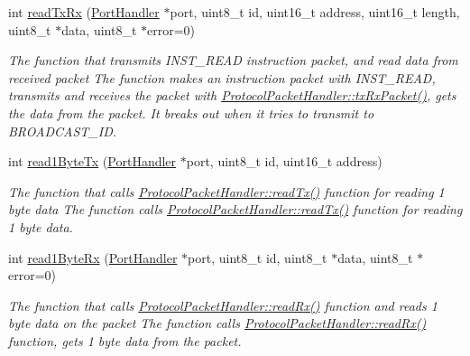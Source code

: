 \begin{DoxyCompactItemize}
int \hyperlink{classmercury_1_1_protocol_packet_handler_a368325ca9c0c783b1e88ef32a4544e51}{read\+Tx\+Rx} (\hyperlink{classmercury_1_1_port_handler}{Port\+Handler} $\ast$port, uint8\+\_\+t id, uint16\+\_\+t address, uint16\+\_\+t length, uint8\+\_\+t $\ast$data, uint8\+\_\+t $\ast$error=0)
\begin{DoxyCompactList}\small\item\em The function that transmits I\+N\+S\+T\+\_\+\+R\+E\+AD instruction packet, and read data from received packet  The function makes an instruction packet with I\+N\+S\+T\+\_\+\+R\+E\+AD,  transmits and receives the packet with \hyperlink{classmercury_1_1_protocol_packet_handler_a68b02f23af616886d0795ea12debd613}{Protocol\+Packet\+Handler\+::tx\+Rx\+Packet()},  gets the data from the packet.  It breaks out  when it tries to transmit to B\+R\+O\+A\+D\+C\+A\+S\+T\+\_\+\+ID. \end{DoxyCompactList}\item 
int \hyperlink{classmercury_1_1_protocol_packet_handler_a764ccc29353523b4a9d65fb4f49e8a34}{read1\+Byte\+Tx} (\hyperlink{classmercury_1_1_port_handler}{Port\+Handler} $\ast$port, uint8\+\_\+t id, uint16\+\_\+t address)
\begin{DoxyCompactList}\small\item\em The function that calls \hyperlink{classmercury_1_1_protocol_packet_handler_aebb2c28d6b3f2e87c7a56b757a24810b}{Protocol\+Packet\+Handler\+::read\+Tx()} function for reading 1 byte data  The function calls \hyperlink{classmercury_1_1_protocol_packet_handler_aebb2c28d6b3f2e87c7a56b757a24810b}{Protocol\+Packet\+Handler\+::read\+Tx()} function for reading 1 byte data. \end{DoxyCompactList}\item 
int \hyperlink{classmercury_1_1_protocol_packet_handler_a36f76224ff911f5bdcc7216ce0f552e3}{read1\+Byte\+Rx} (\hyperlink{classmercury_1_1_port_handler}{Port\+Handler} $\ast$port, uint8\+\_\+t id, uint8\+\_\+t $\ast$data, uint8\+\_\+t $\ast$error=0)
\begin{DoxyCompactList}\small\item\em The function that calls \hyperlink{classmercury_1_1_protocol_packet_handler_af7ff32d0eca6395b92bf7efc02118a27}{Protocol\+Packet\+Handler\+::read\+Rx()} function and reads 1 byte data on the packet  The function calls \hyperlink{classmercury_1_1_protocol_packet_handler_af7ff32d0eca6395b92bf7efc02118a27}{Protocol\+Packet\+Handler\+::read\+Rx()} function,  gets 1 byte data from the packet. \end{DoxyCompactList}\item 

\end{DoxyCompactItemize}
